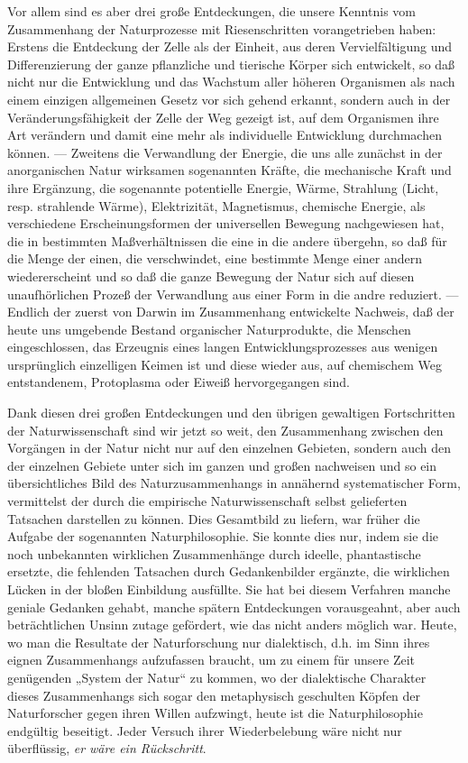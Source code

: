 Vor allem sind es aber drei große Entdeckungen, die unsere
Kenntnis vom Zusammenhang der Naturprozesse mit Riesenschritten
vorangetrieben haben: Erstens die Entdeckung der Zelle als der Einheit,
aus deren Vervielfältigung \textbar{} und Differenzierung \textbar{} der ganze pflanzliche
und tierische Körper sich entwickelt, so daß nicht nur die Entwicklung
und das Wachstum aller höheren Organismen als nach einem einzigen
allgemeinen Gesetz vor sich gehend erkannt, \textbar{} sondern auch in der
Veränderungsfähigkeit der Zelle
der Weg gezeigt ist, auf dem
Organismen ihre Art verändern und damit eine mehr als individuelle
Entwicklung durchmachen können. --- Zweitens \textbar{} die Verwandlung der
Energie, die uns alle zunächst in der anorganischen Natur wirksamen
sogenannten Kräfte, die mechanische Kraft und ihre Ergänzung, die
sogenannte potentielle Energie, Wärme, Strahlung (Licht, resp.
strahlende Wärme), Elektrizität, Magnetismus, chemische Energie, als
verschiedene Erscheinungsformen der universellen Bewegung nachgewiesen
hat, die in bestimmten Maßverhältnissen die eine in die andere übergehn,
so daß für die Menge der einen, die verschwindet, eine bestimmte Menge
einer andern wiedererscheint und so daß die ganze Bewegung der Natur
sich auf diesen unaufhörlichen Prozeß der Verwandlung aus einer Form in
die andre reduziert. --- Endlich der zuerst von Darwin im Zusammenhang
entwickelte Nachweis, daß der heute uns umgebende Bestand organischer
Naturprodukte, die Menschen eingeschlossen, das Erzeugnis eines langen
Entwicklungsprozesses aus wenigen ursprünglich einzelligen Keimen ist
und diese wieder aus, auf chemischem Weg entstandenem, Protoplasma oder
Eiweiß hervorgegangen sind.

Dank diesen drei großen Entdeckungen und den übrigen gewaltigen
Fortschritten der Naturwissenschaft sind wir jetzt so weit, den
Zusammenhang zwischen den Vorgängen in der Natur nicht nur auf den
einzelnen Gebieten, sondern auch den der einzelnen Gebiete unter sich im
ganzen und großen nachweisen und so ein übersichtliches Bild des
Naturzusammenhangs in annähernd systematischer Form, vermittelst der
durch die empirische Naturwissenschaft selbst gelieferten Tatsachen
darstellen zu können. Dies Gesamtbild zu liefern, war früher die Aufgabe
der sogenannten Naturphilosophie. Sie konnte dies nur, indem sie die
noch unbekannten wirklichen Zusammenhänge durch ideelle, phantastische
ersetzte, die fehlenden Tatsachen durch Gedankenbilder ergänzte, die
wirklichen Lücken in der bloßen Einbildung ausfüllte. Sie hat bei diesem
Verfahren manche geniale Gedanken gehabt, manche spätern Entdeckungen
vorausgeahnt, aber auch beträchtlichen Unsinn zutage gefördert, wie das
nicht anders möglich war. Heute, wo man die Resultate der Naturforschung
nur dialektisch, d.h. im Sinn ihres eignen Zusammenhangs aufzufassen
braucht, um zu einem für unsere Zeit genügenden „System der Natur`` zu
kommen, wo der dialektische Charakter dieses Zusammenhangs sich sogar
den metaphysisch geschulten Köpfen der Naturforscher gegen ihren Willen
aufzwingt, heute ist die Naturphilosophie endgültig beseitigt. Jeder
Versuch ihrer Wiederbelebung wäre nicht nur überflüssig, \emph{er wäre
ein Rückschritt}.

